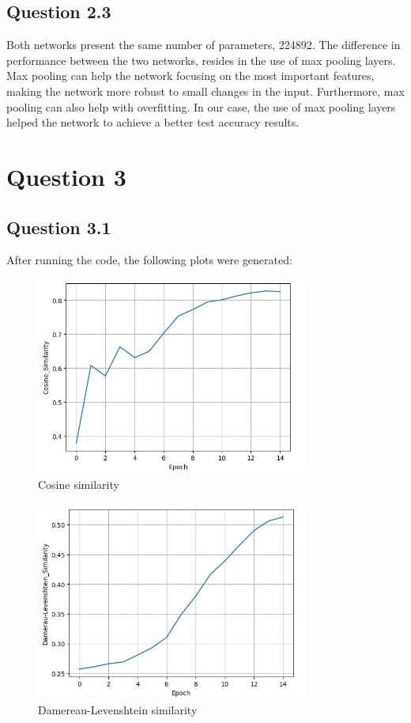 \documentclass{article}
\begin{document}
\subsection{Question 2.3}
Both networks present the same number of parameters, 224892.
The difference in performance between the two networks, resides in the use 
of max pooling layers. Max pooling can help the network focusing on the most
important features, making the network more robust to small changes in the
input. Furthermore, max pooling can also help with overfitting. In our case, 
the use of max pooling layers helped the network to achieve a better test 
accuracy results.

\section{Question 3}

\subsection{Question 3.1}
After running the code, the following plots were generated:

\begin{figure}[H]
    \centering
    \includegraphics[width=0.8\textwidth]{../report/plots/RNN-cosine-similarity.png}
    \caption{Cosine similarity}
    \label{fig:rnn-cosine-similarity}
\end{figure}

\begin{figure}[H]
    \centering
    \includegraphics[width=0.8\textwidth]{../report/plots/RNN-dl-similarity.png}
    \caption{Damereau-Levenshtein similarity}
    \label{fig:rnn-dl-similarity}
\end{figure}
\end{document}
